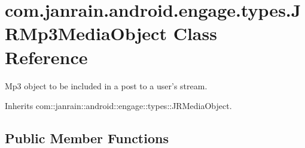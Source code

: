 \hypertarget{classcom_1_1janrain_1_1android_1_1engage_1_1types_1_1_j_r_mp3_media_object}{
\section{com.janrain.android.engage.types.JRMp3MediaObject Class Reference}
\label{classcom_1_1janrain_1_1android_1_1engage_1_1types_1_1_j_r_mp3_media_object}
}


Mp3 object to be included in a post to a user's stream.  




Inherits com::janrain::android::engage::types::JRMediaObject.

\subsection*{Public Member Functions}
